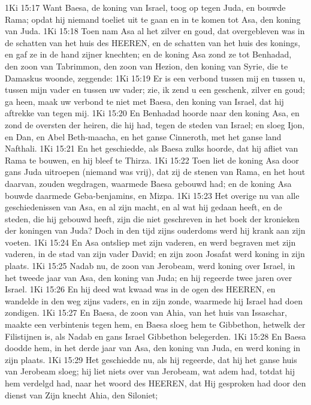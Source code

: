 1Ki 15:17  Want Baesa, de koning van Israel, toog op tegen Juda, en bouwde Rama; opdat hij niemand toeliet uit te gaan en in te komen tot Asa, den koning van Juda.
1Ki 15:18  Toen nam Asa al het zilver en goud, dat overgebleven was in de schatten van het huis des HEEREN, en de schatten van het huis des konings, en gaf ze in de hand zijner knechten; en de koning Asa zond ze tot Benhadad, den zoon van Tabrimmon, den zoon van Hezion, den koning van Syrie, die te Damaskus woonde, zeggende:
1Ki 15:19  Er is een verbond tussen mij en tussen u, tussen mijn vader en tussen uw vader; zie, ik zend u een geschenk, zilver en goud; ga heen, maak uw verbond te niet met Baesa, den koning van Israel, dat hij aftrekke van tegen mij.
1Ki 15:20  En Benhadad hoorde naar den koning Asa, en zond de oversten der heiren, die hij had, tegen de steden van Israel; en sloeg Ijon, en Dan, en Abel Beth-maacha, en het ganse Cinneroth, met het ganse land Nafthali.
1Ki 15:21  En het geschiedde, als Baesa zulks hoorde, dat hij afliet van Rama te bouwen, en hij bleef te Thirza.
1Ki 15:22  Toen liet de koning Asa door gans Juda uitroepen (niemand was vrij), dat zij de stenen van Rama, en het hout daarvan, zouden wegdragen, waarmede Baesa gebouwd had; en de koning Asa bouwde daarmede Geba-benjamins, en Mizpa.
1Ki 15:23  Het overige nu van alle geschiedenissen van Asa, en al zijn macht, en al wat hij gedaan heeft, en de steden, die hij gebouwd heeft, zijn die niet geschreven in het boek der kronieken der koningen van Juda? Doch in den tijd zijns ouderdoms werd hij krank aan zijn voeten.
1Ki 15:24  En Asa ontsliep met zijn vaderen, en werd begraven met zijn vaderen, in de stad van zijn vader David; en zijn zoon Josafat werd koning in zijn plaats.
1Ki 15:25  Nadab nu, de zoon van Jerobeam, werd koning over Israel, in het tweede jaar van Asa, den koning van Juda; en hij regeerde twee jaren over Israel.
1Ki 15:26  En hij deed wat kwaad was in de ogen des HEEREN, en wandelde in den weg zijns vaders, en in zijn zonde, waarmede hij Israel had doen zondigen.
1Ki 15:27  En Baesa, de zoon van Ahia, van het huis van Issaschar, maakte een verbintenis tegen hem, en Baesa sloeg hem te Gibbethon, hetwelk der Filistijnen is, als Nadab en gans Israel Gibbethon belegerden.
1Ki 15:28  En Baesa doodde hem, in het derde jaar van Asa, den koning van Juda, en werd koning in zijn plaats.
1Ki 15:29  Het geschiedde nu, als hij regeerde, dat hij het ganse huis van Jerobeam sloeg; hij liet niets over van Jerobeam, wat adem had, totdat hij hem verdelgd had, naar het woord des HEEREN, dat Hij gesproken had door den dienst van Zijn knecht Ahia, den Siloniet;
